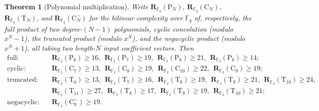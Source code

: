 \documentclass[11pt]{article}
\newtheorem{theorem}{Theorem}
\theoremstyle{definition}
\newcommand{\F}{\mathbb{F}}
\newcommand{\Rk}[2]{\mathbf{R}_{#1}(#2)}
\newcommand{\Cyct}[1]{\mathrm{C}_{#1}}
\newcommand{\Fullt}[1]{\mathrm{P}_{#1}}
\newcommand{\Trunct}[1]{\mathrm{T}_{#1}}
\newcommand{\Negat}[1]{\mathrm{C}^{-}_{#1}}
\begin{document}
\begin{theorem}[Polynomial multiplication]\label{thm:poly}
  Write $\Rk{\F_q}{\Fullt{N}}$, $\Rk{\F_q}{\Cyct{N}}$, $\Rk{\F_q}{\Trunct{N}}$, and
  $\Rk{\F_q}{\Negat{N}}$ for the bilinear complexity over $\F_q$ of, respectively, the
  full product of two degree-$(N-1)$ polynomials, cyclic convolution (modulo $x^N-1$),
  the truncated product (modulo $x^N$), and the negacyclic product (modulo $x^N+1$),
  all taking two length-$N$ input coefficient vectors. Then
  \[
    \begin{aligned}
      \text{full:}       & \quad \Rk{\F_2}{\Fullt{6}}\ge 16,\ \ \Rk{\F_2}{\Fullt{7}}\ge 19,\ \ \Rk{\F_2}{\Fullt{8}}\ge 21,\ \ \Rk{\F_3}{\Fullt{6}}\ge 14;                                      \\
      \text{cyclic:}     & \quad \Rk{\F_2}{\Cyct{7}}\ge 13,\ \ \Rk{\F_2}{\Cyct{8}}\ge 19,\ \ \Rk{\F_2}{\Cyct{10}}\ge 22,\ \ \Rk{\F_3}{\Cyct{9}}\ge 19;                                         \\
      \text{truncated:}  & \quad \Rk{\F_2}{\Trunct{6}}\ge 13,\ \ \Rk{\F_2}{\Trunct{7}}\ge 16,\ \ \Rk{\F_2}{\Trunct{8}}\ge 19,\ \ \Rk{\F_2}{\Trunct{9}}\ge 21,\ \ \Rk{\F_2}{\Trunct{10}}\ge 24, \\
      & \quad \Rk{\F_2}{\Trunct{11}}\ge 27,\ \ \Rk{\F_3}{\Trunct{8}}\ge 17,\ \ \Rk{\F_3}{\Trunct{9}}\ge 19,\ \ \Rk{\F_3}{\Trunct{10}}\ge 21;                                \\
      \text{negacyclic:} & \quad \Rk{\F_3}{\Negat{9}}\ge 19.
    \end{aligned}
  \]
\end{theorem}
\end{document}

